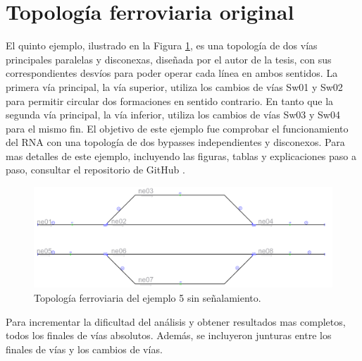 \section{Topología ferroviaria original}

	El quinto ejemplo, ilustrado en la Figura \ref{fig:EJ5_1}, es una topología de dos vías principales paralelas y disconexas, diseñada por el autor de la tesis, con sus correspondientes desvíos para poder operar cada línea en ambos sentidos. La primera vía principal, la vía superior, utiliza los cambios de vías Sw01 y Sw02 para permitir circular dos formaciones en sentido contrario. En tanto que la segunda vía principal, la vía inferior, utiliza los cambios de vías Sw03 y Sw04 para el mismo fin. El objetivo de este ejemplo fue comprobar el funcionamiento del RNA con una topología de dos bypasses independientes y disconexos. Para mas detalles de este ejemplo, incluyendo las figuras, tablas y explicaciones paso a paso, consultar el repositorio de GitHub \cite{GITHUB_PHD}.
	
	\begin{figure}[h]
		\centering
		\includegraphics[width=1\textwidth]{resultados-obtenidos/ejemplo5/images/5_empty.png}
		\centering\caption{Topología ferroviaria del ejemplo 5 sin señalamiento.}
		\label{fig:EJ5_1}
	\end{figure}
	
	Para incrementar la dificultad del análisis y obtener resultados mas completos, todos los finales de vías absolutos. Además, se incluyeron junturas entre los finales de vías y los cambios de vías.
